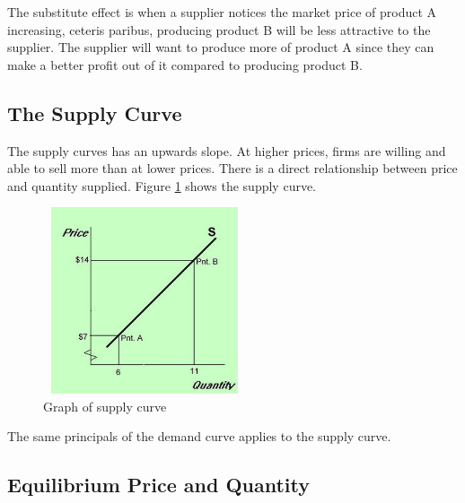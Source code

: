 \documentclass[a4paper, 12pt] {article}
\begin{document}
The substitute effect is when a supplier notices the market price of product A
increasing, ceteris paribus, producing product B will be less attractive to the
supplier. The supplier will want to produce more of product A since they can
make a better profit out of it compared to producing product B.

\subsection{The Supply Curve}
The supply curves has an upwards slope. At higher prices, firms are willing and
able to sell more than at lower prices. There is a direct relationship between
price and quantity supplied. Figure \ref{fig:supply_curve} shows the supply curve.
\begin{figure}[h]
    \centering
    \includegraphics[height=5.5cm, width=6cm]{supply_demand_curve.jpg}
    \caption{Graph of supply curve}
    \label{fig:supply_curve}
\end{figure}

The same principals of the demand curve applies to the supply curve.

\subsection{Equilibrium Price and Quantity}
\end{document}
